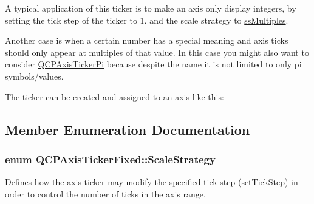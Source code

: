 A typical application of this ticker is to make an axis only display integers, by setting the tick step of the ticker to 1. and the scale strategy to \hyperlink{class_q_c_p_axis_ticker_fixed_a15b3d38b935d404b1311eb85cfb6a439a410f5c537f577b9dda33cb0152b756c6}{ss\+Multiples}.

Another case is when a certain number has a special meaning and axis ticks should only appear at multiples of that value. In this case you might also want to consider \hyperlink{class_q_c_p_axis_ticker_pi}{Q\+C\+P\+Axis\+Ticker\+Pi} because despite the name it is not limited to only pi symbols/values.

The ticker can be created and assigned to an axis like this\+: 
\begin{DoxyCodeInclude}
\end{DoxyCodeInclude}


\subsection{Member Enumeration Documentation}
\subsubsection[{\texorpdfstring{Scale\+Strategy}{ScaleStrategy}}]{\setlength{\rightskip}{0pt plus 5cm}enum {\bf Q\+C\+P\+Axis\+Ticker\+Fixed\+::\+Scale\+Strategy}}\hypertarget{class_q_c_p_axis_ticker_fixed_a15b3d38b935d404b1311eb85cfb6a439}{}\label{class_q_c_p_axis_ticker_fixed_a15b3d38b935d404b1311eb85cfb6a439}
Defines how the axis ticker may modify the specified tick step (\hyperlink{class_q_c_p_axis_ticker_fixed_a4bc83d85a4f81d4abdd3fa5042d7b833}{set\+Tick\+Step}) in order to control the number of ticks in the axis range.

